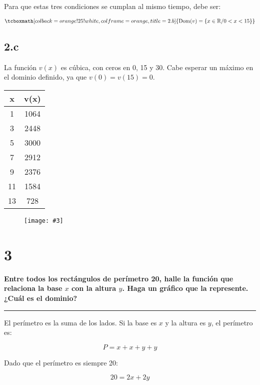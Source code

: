 \documentclass{article}
\newcommand{\hresult}[2]{\tcboxmath[colback=orange!25!white,colframe=orange, title=#1] {#2} }
\newcommand{\figurex}[4]{\begin{figure}[ht] \caption{#1} \texttt{[image: \#3]} \centering \label{#4}\end{figure}}
\newcommand{\sectionx}[1]{\section*{#1}\label{sec:#1}\addcontentsline{toc}{section}{\nameref{sec:#1}}}
\begin{document}
Para que estas tres condiciones se cumplan al mismo tiempo, debe ser:

\begin{equation}
\hresult{2.b}{ \mathop{\text{Dom}}(v) = \{ x \in \mathbb{R} / 0 < x < 15 \} }
\end{equation}

\subsection*{2.c}
\label{subsec:2.c}

La función $v(x)$ es cúbica, con ceros en 0, 15 y 30. Cabe esperar un máximo en el dominio definido, ya que $v(0) = v(15) = 0$.

\begin{center}
\begin{tabular}{||c c||} 
 \hline
 x & v(x) \\ [0.5ex] 
 \hline\hline
 1 & 1064 \\ 
 \hline
 3 & 2448 \\
 \hline
 5 & 3000 \\
 \hline
 7 & 2912 \\
 \hline
 9 & 2376 \\
 \hline
 11 & 1584 \\
 \hline
 13 & 728 \\ [1ex] 
 \hline
\end{tabular}
\end{center}

\newpage

\figurex{}{0.6}{../img/guide_01/ex_02c.png}{fig:2c}

\sectionx{3}

\textbf{Entre todos los rectángulos de perímetro 20, halle la función que relaciona la base $x$ con la altura $y$. Haga un gráfico que la represente. ¿Cuál es el dominio?}

\vspace{1em}
\hrule
\vspace{1em}

El perímetro es la suma de los lados. Si la base es $x$ y la altura es $y$, el perímetro es:

\begin{equation}
P = x + x + y + y
\end{equation}

Dado que el perímetro es siempre 20:

\begin{equation}
20 = 2x + 2y
\end{equation}
\end{document}

